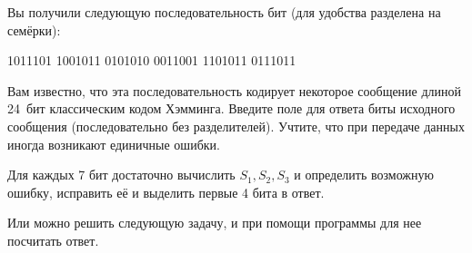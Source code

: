 
Вы получили следующую последовательность бит (для удобства разделена на семёрки): 

\begin{center}
    1011101 1001011 0101010 0011001 1101011 0111011
\end{center}

Вам известно, что эта последовательность кодирует некоторое сообщение длиной 24 бит классическим кодом Хэмминга. Введите поле для ответа биты исходного сообщения (последовательно без разделителей). Учтите, что при передаче данных иногда возникают единичные ошибки.

\solutionSection

Для каждых 7 бит достаточно вычислить $S_1, S_2, S_3$ и определить возможную ошибку, исправить её и выделить первые 4 бита в ответ.

Или можно решить следующую задачу, и при помощи программы для нее посчитать ответ.

